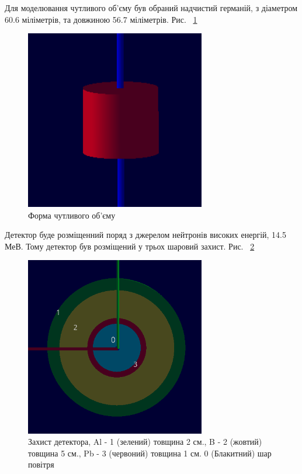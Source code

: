 \documentclass[a4paper, 14pt]{article}
\numberwithin{equation}{section}
\numberwithin{table}{section}
\begin{document}
	Для моделювання чутливого об'єму був обраний надчистий германій, з діаметром 60.6 міліметрів, та довжиною 56.7 міліметрів. Рис. ~\ref{ris:s_detector_volume} 	
	\begin{figure}[hbt!]
		\centering \includegraphics[width=0.7\textwidth]{images/sDetector158cm3.png}
		\caption{Форма чутливого об'єму} 
		\label{ris:s_detector_volume}	
	\end{figure}

	Детектор буде розміщенний поряд з джерелом нейтронів високих енергій, 14.5 МеВ. Тому детектор був розміщений у трьох шаровий захист. Рис. ~\ref{ris:s_detector_P}	
	\begin{figure}[hbt!]
		\centering \includegraphics[width=0.7\textwidth]{images/dectorPrt.png}
		\caption{Захист детектора, Al - 1 (зелений) товщина 2 см., B - 2 (жовтий) товщина 5 см., Pb - 3 (червоний) товщина 1 см. 0 (Блакитний) шар повітря} 
		\label{ris:s_detector_P}	
	\end{figure} 
\end{document}
